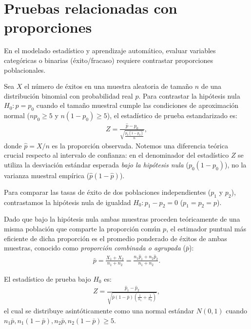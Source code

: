 \section{Pruebas relacionadas con proporciones}

En el modelado estadístico y aprendizaje automático, evaluar variables categóricas o binarias (éxito/fracaso) requiere contrastar proporciones poblacionales.

\begin{teorema}
	Sea $X$ el número de éxitos en una muestra aleatoria de tamaño $n$ de una distribución binomial con probabilidad real $p$. Para contrastar la hipótesis nula $H_0: p = p_0$ cuando el tamaño muestral cumple las condiciones de aproximación normal ($n p_0 \geq 5$ y $n(1-p_0) \geq 5$), el estadístico de prueba estandarizado es:
	\begin{align}
		Z = \frac{\hat{p} - p_0}{\sqrt{\frac{p_0(1-p_0)}{n}}},
	\end{align}
	donde $\hat{p} = X/n$ es la proporción observada. Notemos una diferencia teórica crucial respecto al intervalo de confianza: en el denominador del estadístico $Z$ se utiliza la desviación estándar esperada \emph{bajo la hipótesis nula} ($p_0(1-p_0)$), no la varianza muestral empírica ($\hat{p}(1-\hat{p})$).
\end{teorema}

\begin{teorema}
	Para comparar las tasas de éxito de dos poblaciones independientes ($p_1$ y $p_2$), contrastamos la hipótesis nula de igualdad $H_0: p_1 - p_2 = 0$ ($p_1 = p_2 = p$).

	Dado que bajo la hipótesis nula ambas muestras proceden teóricamente de una misma población que comparte la proporción común $p$, el estimador puntual más eficiente de dicha proporción es el promedio ponderado de éxitos de ambas muestras, conocido como \emph{proporción combinada o agrupada} ($\bar{p}$):
	\begin{align}
		\bar{p} = \frac{X_1 + X_2}{n_1 + n_2} = \frac{n_1 \hat{p}_1 + n_2 \hat{p}_2}{n_1 + n_2}.
		\label{eq:prop_combinada}
	\end{align}

	El estadístico de prueba bajo $H_0$ es:
	\begin{align}
		Z = \frac{\hat{p}_1 - \hat{p}_2}{\sqrt{\bar{p}(1-\bar{p})\left(\frac{1}{n_1} + \frac{1}{n_2}\right)}},
	\end{align}
	el cual se distribuye asintóticamente como una normal estándar $N(0,1)$ cuando $n_1 \bar{p}, n_1(1-\bar{p}), n_2 \bar{p}, n_2(1-\bar{p}) \geq 5$.
\end{teorema}

